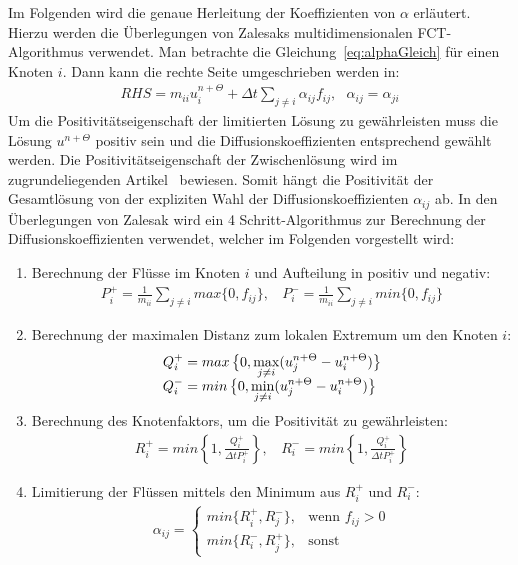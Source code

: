\documentclass[12pt,titlepage]{article}
\begin{document}
Im Folgenden wird die genaue Herleitung der Koeffizienten von $\alpha$ erläutert. Hierzu werden die Überlegungen von Zalesaks multidimensionalen FCT-Algorithmus verwendet\cite{zalesak1979fully}. Man betrachte die Gleichung~\eqref{eq:alphaGleich} für einen Knoten $i$. Dann kann die rechte Seite umgeschrieben werden in:
\begin{align}
 RHS=m_{ii}u_i^{n+\Theta}+\Delta t\sum\limits_{j\neq i}\alpha_{ij}f_{ij},~~~\alpha_{ij}=\alpha_{ji}
\end{align}
Um die Positivitätseigenschaft der limitierten Lösung zu gewährleisten muss die Lösung $u^{n+\Theta}$ positiv sein und die Diffusionskoeffizienten entsprechend gewählt werden. Die Positivitätseigenschaft der Zwischenlösung wird im zugrundeliegenden Artikel~\cite{kuzmin2002flux} bewiesen. Somit hängt die Positivität der Gesamtlösung von der expliziten Wahl der Diffusionskoeffizienten $\alpha_{ij}$ ab. In den Überlegungen von Zalesak wird ein 4 Schritt-Algorithmus zur Berechnung der Diffusionskoeffizienten verwendet, welcher im Folgenden vorgestellt wird:
\begin{enumerate}
 \item Berechnung der Flüsse im Knoten $i$ und Aufteilung in positiv und negativ:
\begin{align}
P_i^+=\frac{1}{m_{ii}}\sum\limits_{j\neq i}max\{0,f_{ij}\},~~~~P_i^-=\frac{1}{m_{ii}}\sum\limits_{j\neq i}min\{0,f_{ij}\}
\end{align}
 \item Berechnung der maximalen Distanz zum lokalen Extremum um den Knoten $i$:
 \begin{align}
Q_i^+&=max\left\{0,\smash{\displaystyle\max_{j\neq i}}(u_j^{n+\Theta}-u_i^{n+\Theta})\right\}\nonumber\\
Q_i^-&=min\left\{0,\smash{\displaystyle\min_{j\neq i}}(u_j^{n+\Theta}-u_i^{n+\Theta})\right\}
\end{align}
 \item Berechnung des Knotenfaktors, um die Positivität zu gewährleisten:
\begin{align}
R_i^+=min\left\{1,\frac{Q_i^+}{\Delta tP_i^+}\right\},~~~~R_i^-=min\left\{1,\frac{Q_i^+}{\Delta tP_i^+}\right\}
\end{align}
 \item Limitierung der Flüssen mittels den Minimum aus $R_i^+$ und $R_i^-$:
\begin{align}
\alpha_{ij}=   \begin{cases}
     min\{R_i^+,R_j^-\}, & \text{wenn } f_{ij}>0 \\
     min\{R_i^-,R_j^+\}, & \text{sonst} 
   \end{cases}
\end{align}
\end{enumerate}
\end{document}
